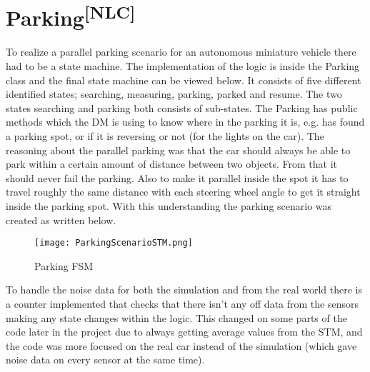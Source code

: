 \section[Parking]{Parking\textsuperscript{[NLC]}}
To realize a parallel parking scenario for an autonomous miniature vehicle there
had to be a state machine. The implementation of the logic is inside the Parking
class and the final state machine can be viewed below. It consists of five
different identified states; searching, measuring, parking, parked and resume.
The two states searching and parking both consists of sub-states. The Parking
has public methods which the DM is using to know where in the parking it is,
e.g. has found a parking spot, or if it is reversing or not (for the lights on
the car). The reasoning about the parallel parking was that the car should
always be able to park within a certain amount of distance between two objects.
From that it should never fail the parking. Also to make it parallel inside the
spot it has to travel roughly the same distance with each steering wheel angle
to get it straight inside the parking spot. With this understanding the parking
scenario was created as written below.
\begin{figure}[ht]
  \centering
  \texttt{[image: ParkingScenarioSTM.png]}
  \caption{Parking FSM}
  \label{parkingfsm}
\end{figure}
To handle the noise data for both the simulation and from the real world there
is a counter implemented that checks that there isn't any off data from the
sensors making any state changes within the logic. This changed on some parts of
the code later in the project due to always getting average values from the STM,
and the code was more focused on the real car instead of the simulation (which
gave noise data on every sensor at the same time).\\

